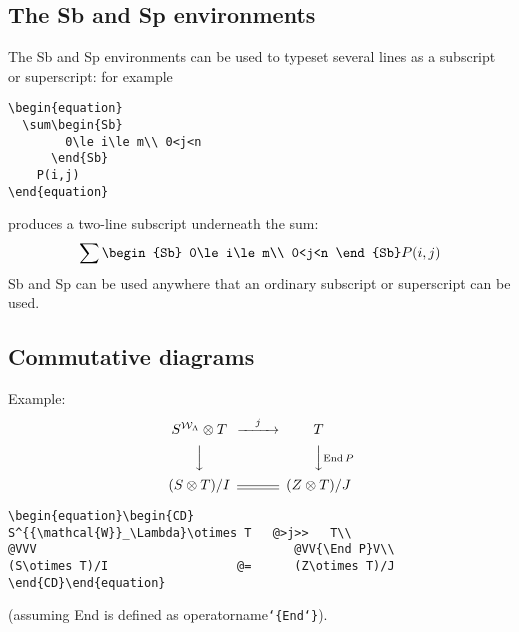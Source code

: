 \documentclass[draft]{amsart}
\newcommand{\ntt}{\normalfont\ttfamily}
\newcommand{\cn}[1]{{\protect\ntt\bslash#1}}
\newcommand{\env}[1]{{\protect\ntt#1}}
\theoremstyle{definition}
\theoremstyle{remark}
\newcommand{\End}{\operatorname{End}}
\begin{document}
\subsection{The \env{Sb} and \env{Sp} environments}

The \env{Sb} and \env{Sp} environments can be used to typeset several
lines as a subscript or superscript:
for example
\begin{verbatim}
\begin{equation}
  \sum\begin{Sb}
        0\le i\le m\\ 0<j<n
      \end{Sb}
    P(i,j)
\end{equation}
\end{verbatim}
produces a two-line subscript underneath the sum:
\begin{equation}
  \sum\begin{Sb}
        0\le i\le m\\ 0<j<n
      \end{Sb}
    P(i,j)
\end{equation}
\env{Sb} and \env{Sp} can be used anywhere that an ordinary subscript or
superscript can be used.

\subsection{Commutative diagrams}

Example:
\begin{equation}\begin{CD}
S^{{\mathcal{W}}_\Lambda}\otimes T   @>j>>   T\\
@VVV                                    @VV{\End P}V\\
(S\otimes T)/I                  @=      (Z\otimes T)/J
\end{CD}\end{equation}
\begin{verbatim}
\begin{equation}\begin{CD}
S^{{\mathcal{W}}_\Lambda}\otimes T   @>j>>   T\\
@VVV                                    @VV{\End P}V\\
(S\otimes T)/I                  @=      (Z\otimes T)/J
\end{CD}\end{equation}
\end{verbatim}
(assuming \cn{End} is defined as \cn{operatorname}{\tt\char`\{End\char`\}}).
\end{document}
